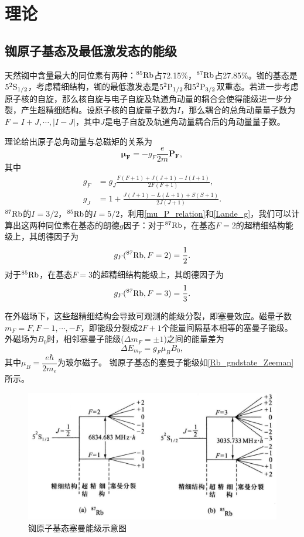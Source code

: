 \documentclass[font=default]{mpltx}
\begin{document}
\section{理论\cite{book}}
\subsection{铷原子基态及最低激发态的能级}
天然铷中含量最大的同位素有两种：${\rm ^{85}Rb}$占72.15\%，${\rm ^{87}Rb}$占27.85\%。铷的基态是${\rm 5^2S_{1/2}}$，考虑精细结构，铷的最低激发态是${\rm 5^2P_{1/2}}$和${\rm 5^2P_{3/2}}$双重态。若进一步考虑原子核的自旋，那么核自旋与电子自旋及轨道角动量的耦合会使得能级进一步分裂，产生超精细结构。设原子核的自旋量子数为$I$，那么耦合的总角动量量子数为$F=I+J,\cdots,|I-J|$，其中$J$是电子自旋及轨道角动量耦合后的角动量量子数。

理论给出原子总角动量与总磁矩的关系为
\begin{equation}\label{mu_P_relation}
  \bm{\mu_F}=-g_F\frac{e}{2m}\bm{P_F},
\end{equation}其中
\begin{equation}\label{Lande_g}
  \begin{aligned}
    g_F&=g_J\frac{F(F+1)+J(J+1)-I(I+1)}{2F(F+1)},\\
    g_J&=1+\frac{J(J+1)-L(L+1)+S(S+1)}{2J(J+1)}.
  \end{aligned}
\end{equation}
${\rm ^{87}Rb}$的$I=3/2$，${\rm ^{85}Rb}$的$I=5/2$，利用\autoref{mu_P_relation}和\autoref{Lande_g}，我们可以计算出这两种同位素在基态的朗德$g$因子：对于${\rm ^{87}Rb}$，在基态$F=2$的超精细结构能级上，其朗德因子为
\begin{equation}\label{Lande_g87}
  g_F({\rm ^{87}Rb},F=2)=\frac{1}{2}.
\end{equation}
对于${\rm ^{85}Rb}$，在基态$F=3$的超精细结构能级上，其朗德因子为
\begin{equation}\label{Lande_g85}
  g_F({\rm ^{87}Rb},F=3)=\frac{1}{3}.
\end{equation}

在外磁场下，这些超精细结构会导致可观测的能级分裂，即塞曼效应。磁量子数$m_F=F,F-1,\cdots,-F$，即能级分裂成$2F+1$个能量间隔基本相等的塞曼子能级。外磁场为$B_0$时，相邻塞曼子能级($\Delta m_F=\pm 1$)之间的能量差为
\begin{equation}
  \Delta E_{m_F}=g_F\mu_B B_0,
\end{equation}其中$\mu_B=\dfrac{e\hbar}{2m_e}$为玻尔磁子。
铷原子基态的塞曼子能级如\autoref{Rb_gndstate_Zeeman}所示。
\begin{figure}
  \centering
  \includegraphics[width=0.8\linewidth]{fig/Rb_gndstate_Zeeman.png}
  \caption{\centering 铷原子基态塞曼能级示意图}
  \label{Rb_gndstate_Zeeman}
\end{figure}
\end{document}
